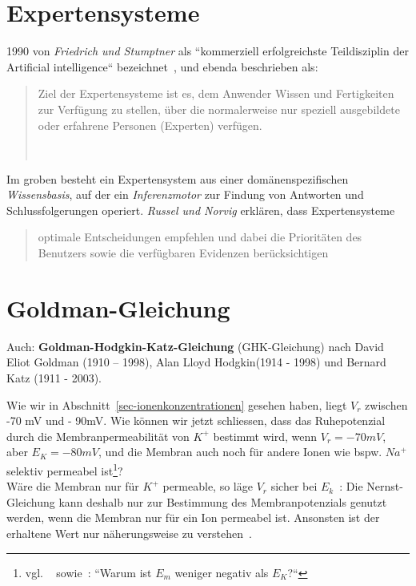 \section{Expertensysteme}\label{appendix:expertensystem}

1990 von \textit{Friedrich und Stumptner} als ``kommerziell erfolgreichste Teildisziplin der Artificial intelligence`` bezeichnet~\cite[14]{FS90}, und ebenda beschrieben als:

\blockquote[{~\cite[14]{FS90}}]{
    Ziel der Expertensysteme ist es, dem Anwender Wissen und Fertigkeiten zur Verfügung zu stellen, über die normalerweise nur speziell ausgebildete oder erfahrene Personen (Experten) verfügen.
}

\noindent
Im groben besteht ein Expertensystem aus einer domänenspezifischen \textit{Wissensbasis}, auf der ein \textit{Inferenzmotor} zur Findung von Antworten und Schlussfolgerungen operiert. \textit{Russel und Norvig} erklären, dass Expertensysteme

\blockquote[{\cite[737]{RN09}}]{
    optimale Entscheidungen empfehlen und dabei die Prioritäten des Benutzers sowie die verfügbaren Evidenzen berücksichtigen
}


\section{Goldman-Gleichung}\label{appendix:goldman}

Auch: \textbf{Goldman-Hodgkin-Katz-Gleichung} (GHK-Gleichung) nach David Eliot Goldman (1910 – 1998), Alan Lloyd Hodgkin(1914 - 1998) und Bernard Katz (1911 - 2003).

Wie wir in Abschnitt~\ref{sec-ionenkonzentrationen} gesehen haben, liegt $V_r$ zwischen -70 mV und - 90mV. Wie können wir jetzt schliessen, dass das Ruhepotenzial durch die Membranpermeabilität von $K^+$ bestimmt wird, wenn $V_r = -70 mV$, aber $E_K = -80 mV$, und die Membran auch noch für andere Ionen wie bspw. $Na^+$ selektiv permeabel ist\footnote{
    vgl. ~\cite[77]{BCP18} sowie~\cite[44]{SD07}: ``Warum ist $E_m$ weniger negativ als $E_K${?}``
}? \\
Wäre die Membran nur für $K^+$ permeable, so läge $V_r$ sicher bei $E_k$~\cite[32]{SD07}: Die Nernst-Gleichung kann deshalb nur zur Bestimmung des Membranpotenzials genutzt werden, wenn die Membran nur für ein Ion permeabel ist. Ansonsten ist der erhaltene Wert nur näherungsweise zu verstehen~\cite[67]{FE19}.\\

